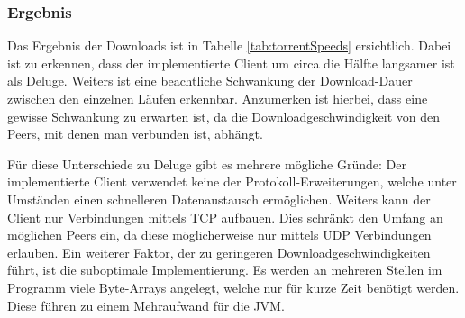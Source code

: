 \subsubsection{Ergebnis}

Das Ergebnis der Downloads ist in Tabelle \ref{tab:torrentSpeeds} ersichtlich. Dabei ist zu erkennen, dass der implementierte Client um circa die Hälfte langsamer ist als Deluge. Weiters ist eine beachtliche Schwankung der Download-Dauer zwischen den einzelnen Läufen erkennbar. Anzumerken ist hierbei, dass eine gewisse Schwankung zu erwarten ist, da die Downloadgeschwindigkeit von den Peers, mit denen man verbunden ist, abhängt. 

Für diese Unterschiede zu Deluge gibt es mehrere mögliche Gründe: Der implementierte Client verwendet keine der Protokoll-Erweiterungen, welche unter Umständen einen schnelleren Datenaustausch ermöglichen. Weiters kann der Client nur Verbindungen mittels TCP aufbauen. Dies schränkt den Umfang an möglichen Peers ein, da diese möglicherweise nur mittels UDP Verbindungen erlauben. Ein weiterer Faktor, der zu geringeren Downloadgeschwindigkeiten führt, ist die suboptimale Implementierung. Es werden an mehreren Stellen im Programm viele Byte-Arrays angelegt, welche nur für kurze Zeit benötigt werden. Diese führen zu einem Mehraufwand für die JVM.

